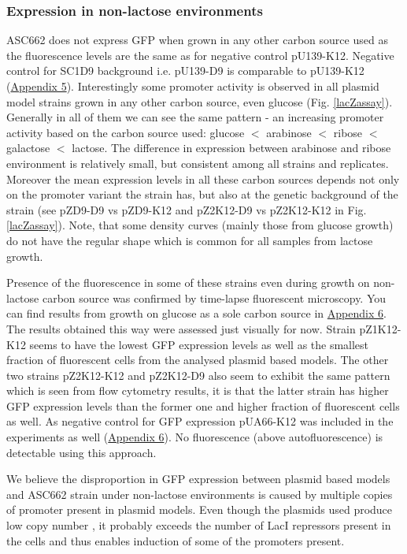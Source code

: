 \subsubsection{Expression in non-lactose environments}
ASC662 does not express GFP when grown in any other carbon source used as the fluorescence levels are the same as for negative control pU139-K12.
Negative control for SC1\textunderscore D9 background i.e. pU139-D9 is comparable to pU139-K12 (\hyperlink{FCnegs}{Appendix 5}).
Interestingly some  promoter activity is observed in all plasmid model strains grown in any other carbon source, even glucose (Fig. \ref{lacZassay}).
Generally in all of them we can see the same pattern - an increasing  promoter activity based on the carbon source used: glucose $<$ arabinose $<$ ribose $<$ galactose $<$ lactose.
The difference in expression between arabinose and ribose environment is relatively small, but consistent among all strains and replicates.
Moreover the mean expression levels in all these carbon sources depends not only on the promoter variant the strain has, but also at the genetic background of the strain (see pZ\textunderscore D9-D9 vs pZ\textunderscore D9-K12 and pZ2\textunderscore K12-D9 vs pZ2\textunderscore K12-K12 in Fig. \ref{lacZassay}).
Note, that some density curves (mainly those from glucose growth) do not have the regular shape which is common for all samples from lactose growth.

Presence of the fluorescence in some of these strains even during growth on non-lactose carbon source was confirmed by time-lapse fluorescent microscopy.
You can find results from growth on glucose as a sole carbon source in \hyperlink{micro}{Appendix 6}.
The results obtained this way were assessed just visually for now.
Strain pZ1\textunderscore K12-K12 seems to have the lowest GFP expression levels as well as the smallest fraction of fluorescent cells from the analysed plasmid based models.
The other two strains pZ2\textunderscore K12-K12 and pZ2\textunderscore K12-D9 also seem to exhibit the same pattern which is seen from flow cytometry results, it is that the latter strain has higher GFP expression levels than the former one and higher fraction of fluorescent cells as well.
As negative control for GFP expression pUA66-K12 was included in the experiments as well (\hyperlink{micro}{Appendix 6}).
No fluorescence (above autofluorescence) is detectable using this approach.

We believe the disproportion in GFP expression between plasmid based models and ASC662 strain under non-lactose environments is caused by multiple copies of  promoter present in plasmid models.
Even though the plasmids used produce low copy number \cite{zaslaver2006comprehensive}, it probably exceeds the number of LacI repressors present in the cells and thus enables induction of some of the  promoters present.

